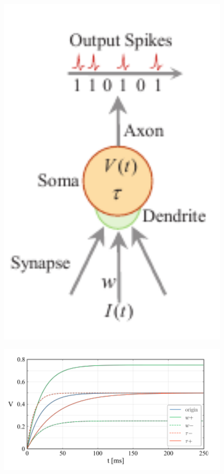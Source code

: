\begin{figure}[htb]
    \centering

    \parbox{1.0\textwidth}{
        \centering

        \begin{minipage}{0.243\textwidth}
            \includegraphics[width=1.0\textwidth]{Static/chap1_paramsnn_neuronmodel.pdf}
            \label{fig:lif}
        \end{minipage}
        \hspace{0.02\textwidth}
        \begin{minipage}{0.657\textwidth}
            \includegraphics[width=1.0\textwidth]{Static/chap1_paramsnn_volttrj.pdf}

\end{minipage}}
\end{figure}
